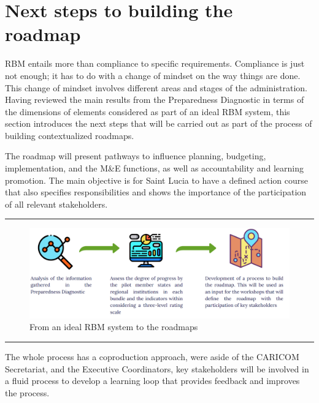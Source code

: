 \documentclass[
  10pt,
]{book}
\begin{document}
\hypertarget{section6}{%
\chapter{Next steps to building the roadmap}\label{section6}}

RBM entails more than compliance to specific requirements. Compliance is just not enough; it has to do with a change of mindset on the way things are done. This change of mindset involves different areas and stages of the administration. Having reviewed the main results from the Preparedness Diagnostic in terms of the dimensions of elements considered as part of an ideal RBM system, this section introduces the next steps that will be carried out as part of the process of building contextualized roadmaps.

The roadmap will present pathways to influence planning, budgeting, implementation, and the M\&E functions, as well as accountability and learning promotion. The main objective is for Saint Lucia to have a defined action course that also specifies responsibilities and shows the importance of the participation of all relevant stakeholders.

\begin{center}\rule{0.5\linewidth}{0.5pt}\end{center}

\begin{figure}

{\centering \includegraphics[width=1\linewidth]{./images/figure_6} 

}

\caption{From an ideal RBM system to the roadmaps}\label{fig:figure6}
\end{figure}

\begin{center}\rule{0.5\linewidth}{0.5pt}\end{center}

The whole process has a coproduction approach, were aside of the CARICOM Secretariat, and the Executive Coordinators, key stakeholders will be involved in a fluid process to develop a learning loop that provides feedback and improves the process.
\end{document}
